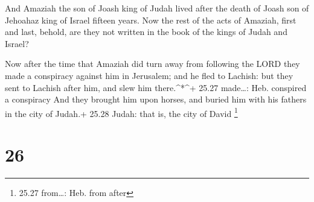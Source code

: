  And Amaziah the son of Joash king of Judah lived after the
death of Joash son of Jehoahaz king of Israel fifteen years.
 Now the rest of the acts of Amaziah, first and last,
behold, are they not written in the book of the kings of Judah and
Israel?

 Now after the time that Amaziah did turn away from
following the LORD they made a conspiracy against him in Jerusalem; and
he fled to Lachish: but they sent to Lachish after him, and slew him
there.\^{}*\^{}+ 25.27 made\ldots: Heb. conspired a conspiracy
 And they brought him upon horses, and buried him with his
fathers in the city of Judah.+ 25.28 Judah: that is, the city of David
\footnote{25.27 from\ldots: Heb. from after}

\hypertarget{section-25}{%
\section{26}\label{section-25}}

